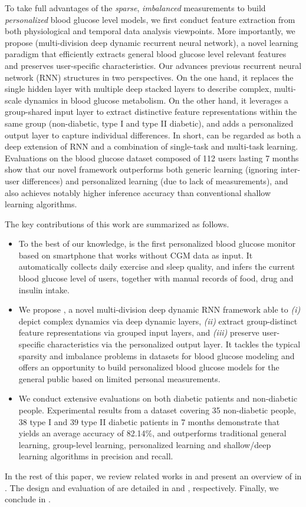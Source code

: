 To take full advantages of the \emph{sparse}, \emph{imbalanced} measurements to build \emph{personalized} blood glucose level models, we first conduct feature extraction from both physiological and temporal data analysis viewpoints. More importantly, we propose \modelname (multi-division deep dynamic recurrent neural network), a novel learning paradigm that efficiently extracts general blood glucose level relevant features and preserves user-specific characteristics.
Our \modelname advances previous recurrent neural network (RNN) structures in two perspectives.
On the one hand, it replaces the single hidden layer with multiple deep stacked layers to describe complex, multi-scale dynamics in blood glucose metabolism.
On the other hand, it leverages a group-shared input layer to extract distinctive feature representations within the same group (\ie non-diabetic, type I and type II diabetic), and adds a personalized output layer to capture individual differences.
In short, \modelname can be regarded as both a deep extension of RNN and a combination of single-task and multi-task learning.
Evaluations on the blood glucose dataset composed of 112 users lasting 7 months show that our novel \modelname framework outperforms both generic learning (\ie ignoring inter-user differences) and personalized learning (due to lack of measurements), and also achieves notably higher inference accuracy than conventional shallow learning algorithms.

The key contributions of this work are summarized as follows.
\begin{itemize}
  \item
  To the best of our knowledge, \sysname is the first personalized blood glucose monitor based on smartphone that works without CGM data as input.
  It automatically collects daily exercise and sleep quality, and infers the current blood glucose level of users,  together with manual records of food, drug and insulin intake.
  \item
  We propose \modelname, a novel multi-division deep dynamic RNN framework able to \emph{(i)} depict complex dynamics via deep dynamic layers, \emph{(ii)} extract group-distinct feature representations via grouped input layers, and \emph{(iii)} preserve user-specific characteristics via the personalized output layer.
  It tackles the typical sparsity and imbalance problems in datasets for blood glucose modeling and offers an opportunity to build personalized blood glucose models for the general public based on limited personal measurements.
  \item
  We conduct extensive evaluations on both diabetic patients and non-diabetic people.
  Experimental results from a dataset covering 35 non-diabetic people, 38 type I and 39 type II diabetic patients in 7 months demonstrate that \sysname yields an average accuracy of 82.14\%, and outperforms traditional general learning, group-level learning, personalized learning and shallow/deep learning algorithms in precision and recall.
\end{itemize}

In the rest of this paper, we review related works in  and present an overview of \sysname in .
The design and evaluation of \sysname are detailed in  and , respectively.
Finally, we conclude in .

